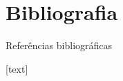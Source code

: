 \documentclass[8pt,aspectratio = 1610]{beamer}
\begin{document}
\section*{Bibliografia}
\begin{frame}[allowframebreaks]{Referências bibliográficas}

[text] 




\end{frame}

\end{document}
